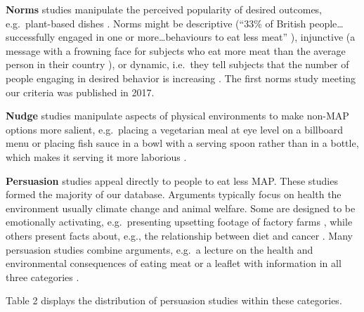 \documentclass[sn-nature,pdflatex]{sn-jnl}
\begin{document}
\textbf{Norms} studies
\citep{aldoh2023, allen2002, alblas2023, coker2022, griesoph2021, piester2020, sparkman2017, sparkman2020}
manipulate the perceived popularity of desired outcomes,
e.g.~plant-based dishes \citep{sparkman2017}. Norms might be descriptive
(``33\% of British people\ldots successfully engaged in one or
more\ldots behaviours to eat less meat'' \citep{aldoh2023}), injunctive
(a message with a frowning face for subjects who eat more meat than the
average person in their country \citep{alblas2023}), or dynamic,
i.e.~they tell subjects that the number of people engaging in desired
behavior is increasing
\citep{aldoh2023, coker2022, sparkman2017, sparkman2020}. The first
norms study meeting our criteria was published in 2017.

\textbf{Nudge} studies \citep{andersson2021, kanchanachitra2020}
manipulate aspects of physical environments to make non-MAP options more
salient, e.g.~placing a vegetarian meal at eye level on a billboard menu
\citep{andersson2021} or placing fish sauce in a bowl with a serving
spoon rather than in a bottle, which makes it serving it more laborious
\citep{kanchanachitra2020}.

\textbf{Persuasion} studies
\citep{kanchanachitra2020, abrahamse2007, acharya2004, berndsen2005, bertolaso2015, bianchi2022, bochmann2017, bschaden2020, carfora2023, cooney2016, fehrenbach2015, feltz2022, haile2021, hatami2018, hennessy2016, mathur2021effectiveness, norris2014, peacock2017, polanco2022, sparkman2021, jalil2023, merrill2009, weingarten2022}
appeal directly to people to eat less MAP. These studies formed the
majority of our database. Arguments typically focus on health the
environment \textemdash usually climate change \textemdash and animal
welfare. Some are designed to be emotionally activating, e.g.~presenting
upsetting footage of factory farms \citep{bertolaso2015}, while others
present facts about, e.g., the relationship between diet and cancer
\citep{hatami2018}. Many persuasion studies combine arguments, e.g.~a
lecture on the health and environmental consequences of eating meat
\citep{jalil2023} or a leaflet with information in all three categories
\citep{hennessy2016}.

Table 2 displays the distribution of persuasion studies within these
categories.
\end{document}
